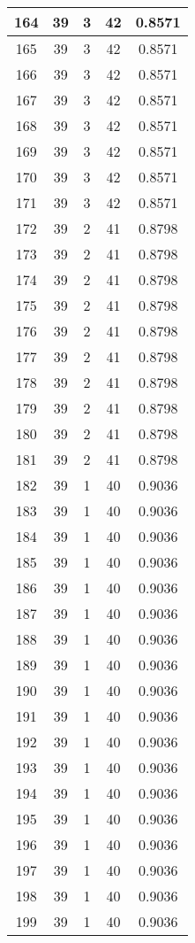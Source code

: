 \documentclass[letterpaper, 12pt]{article}
\begin{document}
\begin{longtable}{|c|c|c|c|c|}
\hline
164 & 39 & 3 & 42 & 0.8571 \\
\hline
165 & 39 & 3 & 42 & 0.8571 \\
\hline
166 & 39 & 3 & 42 & 0.8571 \\
\hline
167 & 39 & 3 & 42 & 0.8571 \\
\hline
168 & 39 & 3 & 42 & 0.8571 \\
\hline
169 & 39 & 3 & 42 & 0.8571 \\
\hline
170 & 39 & 3 & 42 & 0.8571 \\
\hline
171 & 39 & 3 & 42 & 0.8571 \\
\hline
172 & 39 & 2 & 41 & 0.8798 \\
\hline
173 & 39 & 2 & 41 & 0.8798 \\
\hline
174 & 39 & 2 & 41 & 0.8798 \\
\hline
175 & 39 & 2 & 41 & 0.8798 \\
\hline
176 & 39 & 2 & 41 & 0.8798 \\
\hline
177 & 39 & 2 & 41 & 0.8798 \\
\hline
178 & 39 & 2 & 41 & 0.8798 \\
\hline
179 & 39 & 2 & 41 & 0.8798 \\
\hline
180 & 39 & 2 & 41 & 0.8798 \\
\hline
181 & 39 & 2 & 41 & 0.8798 \\
\hline
182 & 39 & 1 & 40 & 0.9036 \\
\hline
183 & 39 & 1 & 40 & 0.9036 \\
\hline
184 & 39 & 1 & 40 & 0.9036 \\
\hline
185 & 39 & 1 & 40 & 0.9036 \\
\hline
186 & 39 & 1 & 40 & 0.9036 \\
\hline
187 & 39 & 1 & 40 & 0.9036 \\
\hline
188 & 39 & 1 & 40 & 0.9036 \\
\hline
189 & 39 & 1 & 40 & 0.9036 \\
\hline
190 & 39 & 1 & 40 & 0.9036 \\
\hline
191 & 39 & 1 & 40 & 0.9036 \\
\hline
192 & 39 & 1 & 40 & 0.9036 \\
\hline
193 & 39 & 1 & 40 & 0.9036 \\
\hline
194 & 39 & 1 & 40 & 0.9036 \\
\hline
195 & 39 & 1 & 40 & 0.9036 \\
\hline
196 & 39 & 1 & 40 & 0.9036 \\
\hline
197 & 39 & 1 & 40 & 0.9036 \\
\hline
198 & 39 & 1 & 40 & 0.9036 \\
\hline
199 & 39 & 1 & 40 & 0.9036 \\
\hline
\end{longtable}
\end{document}

